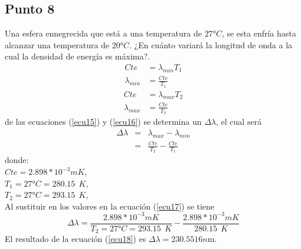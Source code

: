 \documentclass[11pt,graphicx,caption,rotating]{article}
\begin{document}
\subsection{Punto 8}
\noindent
Una esfera ennegrecida que está a una temperatura de $27°C$, se esta enfría hasta alcanzar una temperatura de $20°C$. ¿En cuánto variará la longitud de onda a la cual la densidad de energía es máxima?.\[\]
\noindent
\begin{eqnarray}
 Cte & = \lambda_{min} T_1\nonumber \\
 \lambda_{min} & = \frac{Cte}{T_1} \label{ecu15}
\end{eqnarray}
\begin{eqnarray}
 Cte & = \lambda_{max} T_2\nonumber \\
 \lambda_{max} & = \frac{Cte}{T_2} \label{ecu16}
\end{eqnarray}
\noindent
de las ecuaciones (\ref{ecu15}) y (\ref{ecu16}) se determina un $\Delta \lambda$, el cual será
\begin{eqnarray}
 \Delta \lambda & = & \lambda_{max} - \lambda_{min}\nonumber \\
 & = & \frac{Cte}{T_2} -\frac{Cte}{T_1} \label{ecu17}
\end{eqnarray}
\noindent
donde:\\
$Cte  = 2.898 * 10^{-3}mK$,\\
$T_1 = 27°C = 280.15\ \ K$,\\
$T_2 = 27°C = 293.15\ \ K$,\\
Al sustituir en los valores en la ecuación (\ref{ecu17}) se tiene 
\begin{equation}
 \Delta \lambda = \frac{2.898 * 10^{-3}mK}{T_2 = 27°C = 293.15\ \ K} -\frac{2.898 * 10^{-3}mK}{280.15\ \ K}
\label{ecu18}
\end{equation}
\noindent
El resultado de la ecuación (\ref{ecu18}) es $\Delta \lambda =  230.5516n$m.
\end{document}
